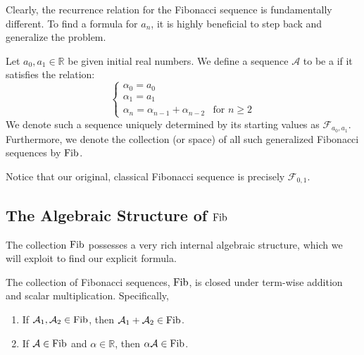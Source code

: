 Clearly, the recurrence relation for the Fibonacci sequence is fundamentally different. To find a formula for $a_n$, it is highly beneficial to step back and generalize the problem.

\begin{definition}
Let $a_0, a_1 \in \mathbb{R}$ be given initial real numbers. We define a sequence $\mathcal{A}$ to be a  if it satisfies the relation:
\begin{equation} \label{eq:generalized_fib_recurrence}
\begin{cases}
\alpha_0 = a_0 \\
\alpha_1 = a_1 \\
\alpha_n = \alpha_{n-1} + \alpha_{n-2} & \text{for } n \ge 2
\end{cases}
\end{equation}
We denote such a sequence uniquely determined by its starting values as $\mathcal{F}_{a_0, a_1}$. Furthermore, we denote the collection (or space) of all such generalized Fibonacci sequences by $\operatorname{Fib}$.
\end{definition}

Notice that our original, classical Fibonacci sequence is precisely $\mathcal{F}_{0, 1}$. 

\subsection{The Algebraic Structure of $\operatorname{Fib}$}

The collection $\operatorname{Fib}$ possesses a very rich internal algebraic structure, which we will exploit to find our explicit formula.

\begin{proposition} \label{prop:fib_closure}
The collection of Fibonacci sequences, $\operatorname{Fib}$, is closed under term-wise addition and scalar multiplication. Specifically,
\begin{enumerate}
    \item If $\mathcal{A}_1, \mathcal{A}_2 \in \operatorname{Fib}$, then $\mathcal{A}_1 + \mathcal{A}_2 \in \operatorname{Fib}$.
    \item If $\mathcal{A} \in \operatorname{Fib}$ and $\alpha \in \mathbb{R}$, then $\alpha \mathcal{A} \in \operatorname{Fib}$.
\end{enumerate}
\end{proposition}

